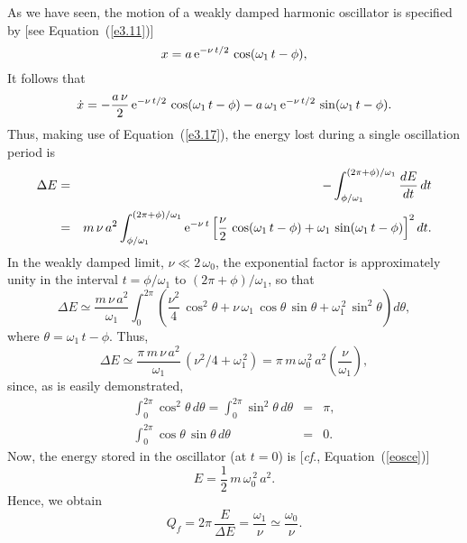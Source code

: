 As we have seen,  the motion of a weakly damped 
harmonic oscillator is specified by [see Equation~(\ref{e3.11})]
\begin{equation}
x = a\,{\rm e}^{-\nu\,t/2}\,\cos(\omega_1\,t-\phi),
\end{equation}
It follows that
\begin{equation}
\dot{x} =- \frac{a\,\nu}{2}\,{\rm e}^{-\nu\,t/2}\,\cos(\omega_1\,t-\phi)-
a\,\omega_1\,{\rm e}^{-\nu\,t/2}\,\sin(\omega_1\,t-\phi).
\end{equation}
Thus, making use of Equation~(\ref{e3.17}), the energy lost during a single oscillation period is
\begin{eqnarray}
\Delta E &=& -\int_{\phi/\omega_1}^{(2\pi+\phi)/\omega_1} \frac{dE}{dt}\,dt\nonumber\\[0.5ex]
&=& m\,\nu\,a^{2}\int_{\phi/\omega_1}^{(2\pi+\phi)/\omega_1}{\rm e}^{-\nu\,t}\left[\frac{\nu}{2}\,\cos(\omega_1\,t-\phi) + \omega_1\,\sin(\omega_1\,t-\phi)\right]^2 dt.
\end{eqnarray}
In the weakly damped limit, $\nu\ll 2\,\omega_0$, the exponential factor is approximately
unity in the interval $t=\phi/\omega_1$ to $(2\pi+\phi)/\omega_1$, so that
\begin{equation}
\Delta E \simeq \frac{m\,\nu\,a^{2}}{\omega_1}\int_0^{2\pi} \left(
\frac{\nu^2}{4}\,\cos^2\theta + \nu\,\omega_1\,\cos\theta\,\sin\theta + \omega_1^{\,2}\,\sin^2\theta\right)d\theta,
\end{equation}
where $\theta=\omega_1\,t-\phi$. 
Thus,
\begin{equation}
\Delta E \simeq \frac{\pi\,m\,\nu\,a^{2}}{\omega_1}\,(\nu^2/4+\omega_1^{\,2}) = \pi\,m\,\omega_0^{\,2}\,a^{2}\left(\frac{\nu}{\omega_1}\right),
\end{equation}
since, as is easily demonstrated, 
\begin{eqnarray}
\int_0^{2\pi}\cos^2\theta\,d\theta = \int_0^{2\pi}\sin^2\theta\,d\theta &=& \pi,\\[0.5ex]
\int_0^{2\pi}\cos\theta\,\sin\theta\,d\theta &=& 0.
\end{eqnarray}
Now, the energy stored in the oscillator
(at $t=0$) is [{\em cf}., Equation~(\ref{eosce})]
\begin{equation}
E = \frac{1}{2}\,m\,\omega_0^{\,2}\,a^{2}.
\end{equation}
Hence, we obtain
\begin{equation}\label{e3.28x}
Q_f = 2\pi\,\frac{E}{\Delta E} = \frac{\omega_1}{\nu}\simeq \frac{\omega_0}{\nu}.
\end{equation}

